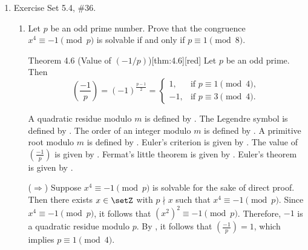 \begin{enumerate}
\begin{enumerate}
\begin{subprove}
      Since $p-a \equiv r^{\operatorname{ind}_r a + (p-1)/2} \pmod{p}$ and $p-a \equiv r^{\operatorname{ind}_r(p-a)} \pmod{p}$, it follows that
      \[
      r^{\operatorname{ind}_r a + (p-1)/2} \equiv r^{\operatorname{ind}_r(p-a)} \pmod{p}.
      \]
      
      Since the order of $r$ modulo $p$ is $p-1$, by , it follows that
      \[
      \operatorname{ind}_r a + \frac{p-1}{2} \equiv \operatorname{ind}_r(p-a) \pmod{p-1}.
      \]
      Therefore, $\operatorname{ind}_r(p-a) \equiv \operatorname{ind}_r a + \frac{p-1}{2} \pmod{p-1}$.
    \end{subprove}
  \end{enumerate}




  \newpage
  \item Exercise Set 5.4, \#36.
  \begin{enumerate}
    \item Let $p$ be an odd prime number. Prove that the congruence $x^4 \equiv -1 \pmod{p}$ is solvable 
    if and only if $p \equiv 1 \pmod{8}$.
    \begin{define}{Theorem 4.6 (Value of $(-1/p)$)}[thm:4.6][red]
      Let $p$ be an odd prime. Then
      \[
      \left(\frac{-1}{p}\right)=(-1)^{\frac{p-1}{2}}=
      \begin{cases}
      1, & \text{if } p\equiv 1\pmod 4,\\[4pt]
      -1,& \text{if } p\equiv 3\pmod 4.
      \end{cases}
      \]
    \end{define}
    \begin{subprove}
      A quadratic residue modulo $m$ is defined by .
      The Legendre symbol is defined by .
      The order of an integer modulo $m$ is defined by .
      A primitive root modulo $m$ is defined by .
      Euler's criterion is given by .
      The value of $\left(\frac{-1}{p}\right)$ is given by .
      Fermat's little theorem is given by .
      Euler's theorem is given by .
      
      ($\Rightarrow$) Suppose $x^4 \equiv -1 \pmod{p}$ is solvable for the sake of direct proof.
      Then there exists $x \in \setZ$ with $p \nmid x$ such that $x^4 \equiv -1 \pmod{p}$.
      Since $x^4 \equiv -1 \pmod{p}$, it follows that $(x^2)^2 \equiv -1 \pmod{p}$.
      Therefore, $-1$ is a quadratic residue modulo $p$.
      By , it follows that $\left(\frac{-1}{p}\right) = 1$, which implies $p \equiv 1 \pmod{4}$.
      

\end{subprove}
\end{enumerate}
\end{enumerate}
